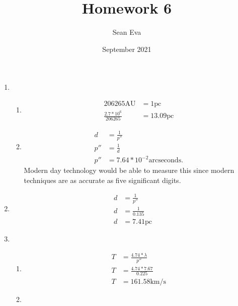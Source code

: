 \documentclass{article}
\title{Homework 6}
\author{Sean Eva}
\date{September 2021}
\begin{document}
\maketitle

\begin{enumerate}
    \item 
    
    \begin{enumerate}
        \item 
        
        \begin{align*}
            206265 \text{AU} &= 1 \text{pc}\\
            \frac{2.7*10^6}{206265} &= 13.09 \text{pc}
        \end{align*}
        
        \item
        
        \begin{align*}
            d &= \frac{1}{p''}\\
            p'' &= \frac{1}{d}\\
            p'' &= 7.64*10^{-2}\text{arcseconds}.
        \end{align*} Modern day technology would be able to measure this since modern techniques are as accurate as five significant digits.
    \end{enumerate}
    
    \item
    
    \begin{align*}
        d &= \frac{1}{p''}\\
        d &= \frac{1}{0.135}\\
        d &= 7.41\text{pc}
    \end{align*}
    
    \item
    
    \begin{enumerate}
        \item 
        
        \begin{align*}
            T &= \frac{4.74*\lambda}{p''}\\
            T &= \frac{4.74 * 7.67}{0.225}\\
            T &= 161.58 \text{km/s}
        \end{align*}
        
        \item
        

\end{enumerate}
\end{enumerate}
\end{document}

